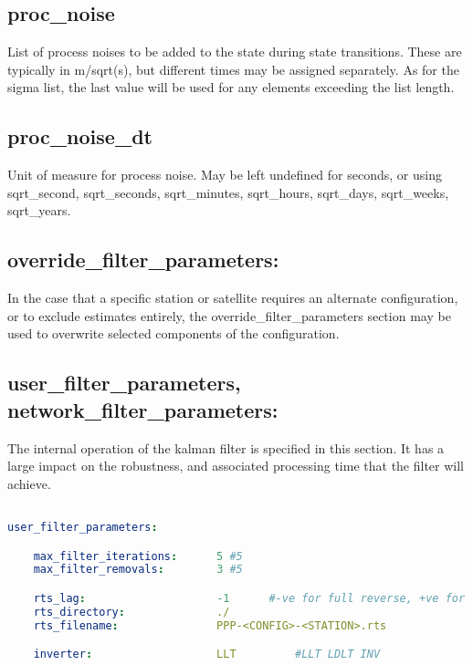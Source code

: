 \subsection*{proc\_noise}

List of process noises to be added to the state during state transitions. These are typically in m/sqrt(s), but different times may be assigned separately.
As for the sigma list, the last value will be used for any elements exceeding the list length.

\subsection*{proc\_noise\_dt}

Unit of measure for process noise. 
May be left undefined for seconds, or using sqrt\_second, sqrt\_seconds, sqrt\_minutes, sqrt\_hours, sqrt\_days, sqrt\_weeks, sqrt\_years.

\subsection{override\_filter\_parameters:}

In the case that a specific station or satellite requires an alternate configuration, or to exclude estimates entirely, the override\_filter\_parameters section may be used to overwrite selected components of the configuration.


\subsection{user\_filter\_parameters, network\_filter\_parameters:}

The internal operation of the kalman filter is specified in this section. It has a large impact on the robustness, and associated processing time that the filter will achieve.

\begin{lstlisting}[language=yaml,caption=Filter Operating Parameters:]

user_filter_parameters:

    max_filter_iterations:      5 #5
    max_filter_removals:        3 #5

    rts_lag:                    -1      #-ve for full reverse, +ve for limited epochs
    rts_directory:              ./
    rts_filename:               PPP-<CONFIG>-<STATION>.rts

    inverter:                   LLT         #LLT LDLT INV

\end{lstlisting}


